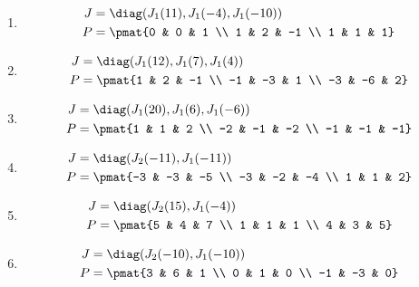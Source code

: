 \begin{enumerate}
\item

\begin{align*}
J &= \diag(J_{1}(11), J_{1}(-4), J_{1}(-10))\\
P &= \pmat{0 & 0 & 1 \\ 1 & 2 & -1 \\ 1 & 1 & 1}
\end{align*}

\item

\begin{align*}
J &= \diag(J_{1}(12), J_{1}(7), J_{1}(4))\\
P &= \pmat{1 & 2 & -1 \\ -1 & -3 & 1 \\ -3 & -6 & 2}
\end{align*}

\item

\begin{align*}
J &= \diag(J_{1}(20), J_{1}(6), J_{1}(-6))\\
P &= \pmat{1 & 1 & 2 \\ -2 & -1 & -2 \\ -1 & -1 & -1}
\end{align*}

\item

\begin{align*}
J &= \diag(J_{2}(-11), J_{1}(-11))\\
P &= \pmat{-3 & -3 & -5 \\ -3 & -2 & -4 \\ 1 & 1 & 2}
\end{align*}

\item

\begin{align*}
J &= \diag(J_{2}(15), J_{1}(-4))\\
P &= \pmat{5 & 4 & 7 \\ 1 & 1 & 1 \\ 4 & 3 & 5}
\end{align*}

\item

\begin{align*}
J &= \diag(J_{2}(-10), J_{1}(-10))\\
P &= \pmat{3 & 6 & 1 \\ 0 & 1 & 0 \\ -1 & -3 & 0}
\end{align*}


\end{enumerate}
